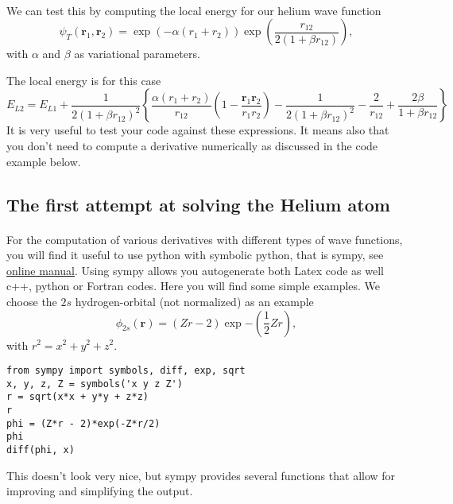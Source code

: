 \documentclass[%
twoside,                 %
final,                   %
10pt]{article}
\begin{document}
\paragraph{}

We can test this by computing the local energy for our helium wave function
\[
   \psi_{T}(\bm{r}_1,\bm{r}_2) = 
   \exp{\left(-\alpha(r_1+r_2)\right)}
   \exp{\left(\frac{r_{12}}{2(1+\beta r_{12})}\right)}, 
\]
with $\alpha$ and $\beta$ as variational parameters.

The local energy is for this case 
\[ 
E_{L2} = E_{L1}+\frac{1}{2(1+\beta r_{12})^2}\left\{\frac{\alpha(r_1+r_2)}{r_{12}}(1-\frac{\bm{r}_1\bm{r}_2}{r_1r_2})-\frac{1}{2(1+\beta r_{12})^2}-\frac{2}{r_{12}}+\frac{2\beta}{1+\beta r_{12}}\right\}
\]
It is very useful to test your code against these expressions. It means also that you don't need to
compute a derivative numerically as discussed in the code example below.



\subsection*{The first attempt at solving the Helium atom}

\paragraph{}
For the computation of various derivatives with different types of wave functions, you will find it useful to use python with symbolic python, that is sympy, see \href{{http://docs.sympy.org/latest/index.html}}{online manual}.  Using sympy allows you autogenerate both Latex code as well c++, python or Fortran codes. Here you will find some simple examples. We choose 
the $2s$ hydrogen-orbital  (not normalized) as an example
\[
 \phi_{2s}(\bm{r}) = (Zr - 2)\exp{-(\frac{1}{2}Zr)},
\]
with $ r^2 = x^2 + y^2 + z^2$.

\begin{verbatim}
from sympy import symbols, diff, exp, sqrt
x, y, z, Z = symbols('x y z Z')
r = sqrt(x*x + y*y + z*z)
r
phi = (Z*r - 2)*exp(-Z*r/2)
phi
diff(phi, x)
\end{verbatim}
This doesn't look very nice, but sympy provides several functions that allow for improving and simplifying the output.
\end{document}
